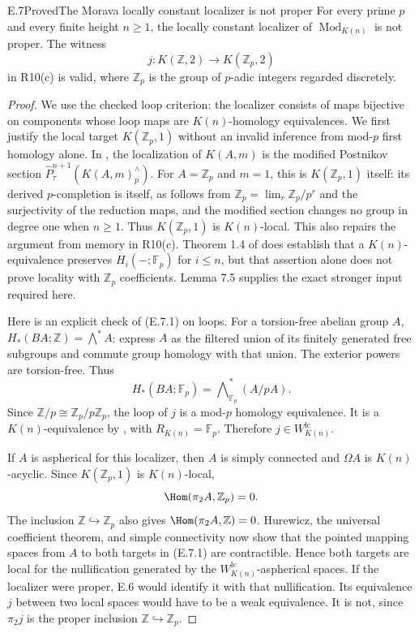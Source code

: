 \begin{claim}{E.7}{Proved}{The Morava locally constant localizer is not proper}
For every prime $p$ and every finite height $n\geq1$, the
locally constant localizer of $\operatorname{Mod}_{K(n)}$
is not proper. The witness
\[
 j:K(\mathbb Z,2)\longrightarrow K(\mathbb Z_p,2)          \tag{E.7.1}
\]
in R10(c) is valid, where $\mathbb Z_p$ is the group
of $p$-adic integers regarded discretely.
\end{claim}
\begin{proof}
We use the checked loop criterion: the localizer consists
of maps bijective on components whose loop maps are
$K(n)$-homology equivalences. We first justify the
local target $K(\mathbb Z_p,1)$ without an invalid
inference from mod-$p$ first homology alone.
In \citet[Lemma 7.5]{EH5Bousfield2001}, the localization of
$K(A,m)$ is the modified Postnikov section
$\widehat P^{n+1}_{\tau}(K(A,m)^{\wedge}_p)$.
For $A=\mathbb Z_p$ and $m=1$, this is $K(\mathbb Z_p,1)$
itself: its derived $p$-completion is itself, as follows from
$\mathbb Z_p=\lim_r\mathbb Z_p/p^r$ and the surjectivity of
the reduction maps, and the modified section changes no
group in degree one when $n\geq1$.
Thus $K(\mathbb Z_p,1)$ is $K(n)$-local.
This also repairs the argument from memory in R10(c).
Theorem 1.4 of \citet{EH5BousfieldKn} does establish that a
$K(n)$-equivalence preserves $H_i(-;\mathbb F_p)$ for $i\leq n$,
but that assertion alone does not prove locality with
$\mathbb Z_p$ coefficients. Lemma 7.5 supplies the exact stronger
input required here.

Here is an explicit check of (E.7.1) on loops.
For a torsion-free abelian group $A$,
$H_*(BA;\mathbb Z)=\bigwedge^*A$: express $A$ as
the filtered union of its finitely generated free
subgroups and commute group homology with that union.
The exterior powers are torsion-free. Thus
\[
 H_*(BA;\mathbb F_p)=
             \bigwedge\nolimits_{\mathbb F_p}^*(A/pA).
\]
Since $\mathbb Z/p\cong\mathbb Z_p/p\mathbb Z_p$,
the loop of $j$ is a mod-$p$ homology equivalence.
It is a $K(n)$-equivalence by
\citet[Lemma 10.6]{EH5Bousfield1997}, with
$R_{K(n)}=\mathbb F_p$. Therefore $j\in W^{\mathrm{lc}}_{K(n)}$.

If $A$ is aspherical for this localizer, then
$A$ is simply connected and $\Omega A$ is
$K(n)$-acyclic. Since $K(\mathbb Z_p,1)$ is
$K(n)$-local,
\[
 \Hom(\pi_2A,\mathbb Z_p)=0.
\]
The inclusion $\mathbb Z\hookrightarrow\mathbb Z_p$
also gives $\Hom(\pi_2A,\mathbb Z)=0$. Hurewicz,
the universal coefficient theorem, and simple
connectivity now show that the pointed mapping
spaces from $A$ to both targets in (E.7.1) are
contractible. Hence both targets are local for
the nullification generated by the
$W^{\mathrm{lc}}_{K(n)}$-aspherical spaces.
If the localizer were proper, E.6 would identify
it with that nullification. Its equivalence
$j$ between two local spaces would have to be
a weak equivalence. It is not, since
$\pi_2j$ is the proper inclusion
$\mathbb Z\hookrightarrow\mathbb Z_p$.
\end{proof}

